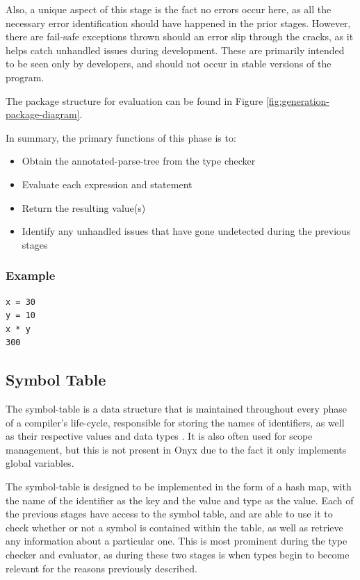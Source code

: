 \documentclass[
]{report}
\begin{document}
Also, a unique aspect of this stage is the fact no errors occur here, as
all the necessary error identification should have happened in the prior
stages. However, there are fail-safe exceptions thrown should an error
slip through the cracks, as it helps catch unhandled issues during
development. These are primarily intended to be seen only by developers,
and should not occur in stable versions of the program.

The package structure for evaluation can be found in Figure \ref{fig:generation-package-diagram}.

In summary, the primary functions of this phase is to: 
\begin{itemize}
	\item Obtain the \gls{annotated-parse-tree} from the type checker
	\item Evaluate each \gls{expression} and \gls{statement}
	\item Return the resulting value(s)
	\item Identify any unhandled issues that have gone undetected during the previous stages
\end{itemize}

\subsubsection{Example}
\begin{verbatim}
x = 30
y = 10
x * y
300
\end{verbatim}

\subsection{Symbol Table}
The \gls{symbol-table} is a data structure that is maintained throughout every
phase of a compiler's life-cycle, responsible for storing the names of
\glspl{identifier}, as well as their respective values and data types \cite{tutorials-guide}.
It is also often used for scope management, but this is not present in
Onyx due to the fact it only implements global variables.

The \gls{symbol-table} is designed to be implemented in the form of a hash
map, with the name of the \gls{identifier} as the key and the value and type
as the value. Each of the previous stages have access to the symbol
table, and are able to use it to check whether or not a \gls{symbol} is
contained within the table, as well as retrieve any information about a
particular one. This is most prominent during the type checker and
evaluator, as during these two stages is when types begin to become
relevant for the reasons previously described.
\end{document}
